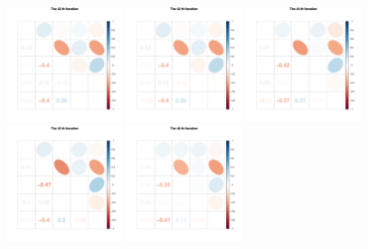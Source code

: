 \begin{figure}[h]
\includegraphics[width=0.3\textwidth,height=0.2\textheight]{Chapters/05MCMCOU/plots/paraEvolution/corMatrix42.pdf}
\includegraphics[width=0.3\textwidth,height=0.2\textheight]{Chapters/05MCMCOU/plots/paraEvolution/corMatrix42.pdf}
\includegraphics[width=0.3\textwidth,height=0.2\textheight]{Chapters/05MCMCOU/plots/paraEvolution/corMatrix44.pdf}
\includegraphics[width=0.3\textwidth,height=0.2\textheight]{Chapters/05MCMCOU/plots/paraEvolution/corMatrix45.pdf}
\includegraphics[width=0.3\textwidth,height=0.2\textheight]{Chapters/05MCMCOU/plots/paraEvolution/corMatrix46.pdf}

\end{figure}
